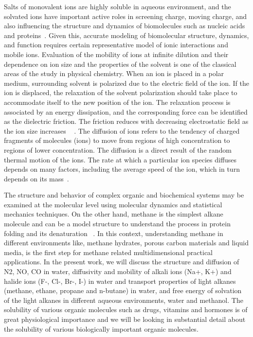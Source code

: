 Salts of monovalent ions are highly soluble in aqueous environment, and the solvated ions have important active roles in screening charge, moving charge, and also influencing the structure and dynamics of biomolecules such as nucleic acids and  proteins~\citep{auffinger2004, flick2013}. Given this, accurate modeling of biomolecular structure, dynamics, and function requires certain representative model of ionic interactions and mobile ions. Evaluation of the mobility of ions at infinite dilution and their dependence on ion size and the properties of the solvent is one of the classical areas of the study in physical chemistry. When an ion is placed in a polar medium, surrounding solvent is polarized due to the electric field of the ion. If the ion is displaced, the relaxation of the solvent polarization should take place to accommodate itself to the new position of the ion. The relaxation process is associated by an energy dissipation, and the corresponding force can be identified as the dielectric friction. The friction reduces with decreasing electrostatic field as the ion size increases ~ \citep{chong1999dynamics} . The diffusion of ions refers to the tendency of charged fragments of molecules (ions) to move from regions of high concentration to regions of lower concentration. The diffusion is a direct result of
the random thermal motion of the ions. The rate at which a particular ion species diffuses depends
on many factors, including the average speed of the ion, which in turn depends on its mass~\citep{atkins2006}.

\begin{sloppypar}
The structure and behavior of complex organic and biochemical systems may be examined at the molecular level using molecular dynamics and statistical mechanics techniques. On the other hand, methane is the simplest alkane molecule and can be a model structure to understand the process in protein folding and its denaturation ~\citep{Hummer1998}. In this context, understanding methane in different environments like, methane hydrates, porous carbon materials and liquid media, is the first step for methane related multidimensional practical applications. In the present work, we will discuss the structure and diffusion of N2, NO, CO in water, diffusivity and mobility of alkali ions (Na+, K+)  and halide ions (F-, Cl-, Br-, I-) in water and transport   properties of light alkanes (methane, ethane, propane and n-butane) in water, and free energy of solvation of the light alkanes in different aqueous environments, water and methanol. The solubility of various organic molecules such as drugs, vitamins and hormones is of
great physiological importance and we will be looking in substantial detail about the
solubility of various biologically important organic molecules. 
\end{sloppypar}


